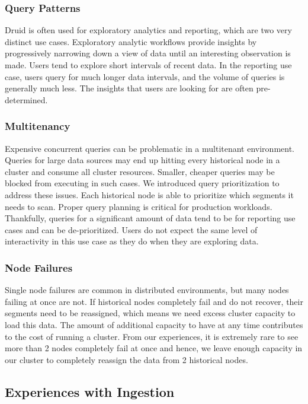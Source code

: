 \documentclass{vldb}
\begin{document}
\subsubsection{Query Patterns}
Druid is often used for exploratory analytics and reporting, which are two very
distinct use cases. Exploratory analytic workflows provide insights by
progressively narrowing down a view of data until an interesting observation is
made. Users tend to explore short intervals of recent data. In the reporting
use case, users query for much longer data intervals, and the volume of queries
is generally much less. The insights that users are looking for are often
pre-determined. 

\subsubsection{Multitenancy}
Expensive concurrent queries can be problematic in a multitenant environment.
Queries for large data sources may end up hitting every historical node in a
cluster and consume all cluster resources. Smaller, cheaper queries may be
blocked from executing in such cases. We introduced query prioritization to
address these issues. Each historical node is able to prioritize which segments
it needs to scan. Proper query planning is critical for production workloads.
Thankfully, queries for a significant amount of data tend to be for reporting
use cases and can be de-prioritized. Users do not expect the same level of
interactivity in this use case as they do when they are exploring data. 

\subsubsection{Node Failures}
Single node failures are common in distributed environments, but many nodes
failing at once are not. If historical nodes completely fail and do not
recover, their segments need to be reassigned, which means we need excess
cluster capacity to load this data. The amount of additional capacity to have
at any time contributes to the cost of running a cluster. From our experiences,
it is extremely rare to see more than 2 nodes completely fail at once and
hence, we leave enough capacity in our cluster to completely reassign the data
from 2 historical nodes. 

\subsection{Experiences with Ingestion}
\end{document}
